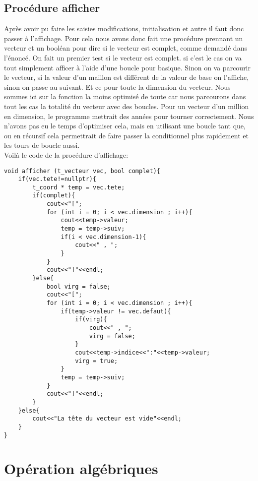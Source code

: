 \documentclass[a4paper,11pt,final]{article}
\begin{document}
\subsection{Procédure afficher}
Après avoir pu faire les saisies modifications, initialisation et autre il faut donc passer à l'affichage. Pour cela nous avons donc fait une procédure prennant un vecteur et un booléan pour dire si le vecteur est complet, comme demandé dans l'énoncé. On fait un premier test si le vecteur est complet. si c'est le cas on va tout simplement afficer à l'aide d'une boucle pour basique. Sinon on va parcourir le vecteur, si la valeur d'un maillon est différent de la valeur de base on l'affiche, sinon on passe au suivant. Et ce pour toute la dimension du vecteur. Nous sommes ici sur la fonction la moins optimisé de toute car nous parcourons dans tout les cas la totalité du vecteur avec des boucles. Pour un vecteur d'un million en dimension, le programme mettrait des années pour tourner correctement. Nous n'avons pas eu le temps d'optimiser cela, mais en utilisant une boucle tant que, ou en récursif cela permettrait de faire passer la conditionnel plus rapidement et les tours de boucle aussi.\\

\pagebreak
Voilà le code de la procédure d'affichage:
\begin{verbatim}
void afficher (t_vecteur vec, bool complet){
    if(vec.tete!=nullptr){
        t_coord * temp = vec.tete;
        if(complet){
            cout<<"[";
            for (int i = 0; i < vec.dimension ; i++){
                cout<<temp->valeur;
                temp = temp->suiv;
                if(i < vec.dimension-1){
                    cout<<" , ";
                }
            }
            cout<<"]"<<endl;
        }else{
            bool virg = false;
            cout<<"[";
            for (int i = 0; i < vec.dimension ; i++){
                if(temp->valeur != vec.defaut){
                    if(virg){
                        cout<<" , ";
                        virg = false;
                    }
                    cout<<temp->indice<<":"<<temp->valeur;
                    virg = true;
                }
                temp = temp->suiv;
            }
            cout<<"]"<<endl;
        }
    }else{
        cout<<"La tête du vecteur est vide"<<endl;
    }
}
\end{verbatim}

\section{Opération algébriques}
\end{document}
